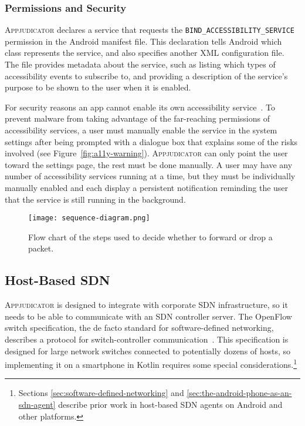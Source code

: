
\subsubsection{Permissions and Security}
\label{sec:accessibility-permissions}

\textsc{Appjudicator} declares a service that requests the
\texttt{BIND\_ACCESSIBILITY\_SERVICE} permission in the Android manifest file.
This declaration tells Android which class represents the service, and also
specifies another XML configuration file. The file provides metadata about the
service, such as listing which types of accessibility events to subscribe to,
and providing a description of the service's purpose to be shown to the user
when it is enabled.

For security reasons an app cannot enable its own accessibility
service~\cite{kalysch2018}. To prevent malware from taking advantage of the
far-reaching permissions of accessibility services, a user must manually enable
the service in the system settings after being prompted with a dialogue box that
explains some of the risks involved (see Figure~\ref{fig:a11y-warning}).
\textsc{Appjudicator} can only point the user toward the settings page, the rest
must be done manually. A user may have any number of accessibility services
running at a time, but they must be individually manually enabled and each
display a persistent notification reminding the user that the service is still
running in the background.


\begin{figure}[p]
    \centering
    \texttt{[image: sequence-diagram.png]}
    \caption{Flow chart of the steps used to decide whether to forward or drop a
		packet.}
	\label{fig:packet-flow-chart}
\end{figure}


\subsection{Host-Based SDN}
\label{sec:host-based-sdn}

\textsc{Appjudicator} is designed to integrate with corporate SDN
infrastructure, so it needs to be able to communicate with an SDN controller
server. The OpenFlow switch specification, the de facto standard for
software-defined networking, describes a protocol for switch-controller
communication~\cite{openflowspec}. This specification is designed for large
network switches connected to potentially dozens of hosts, so implementing it on
a smartphone in Kotlin requires some special considerations.\footnote{Sections
\ref{sec:software-defined-networking} and 
\ref{sec:the-android-phone-as-an-sdn-agent} describe prior work in host-based
SDN agents on Android and other platforms.}

